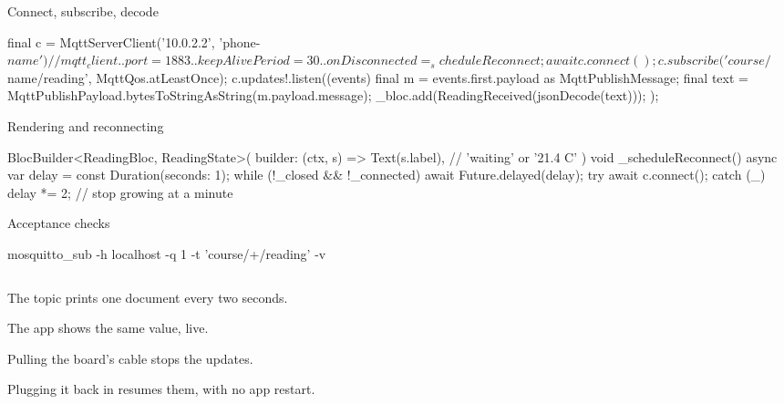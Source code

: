 \documentclass[10pt,aspectratio=169,t]{beamer}
\begin{document}
\begin{frame}[fragile,eyebrow=Task III]{Connect, subscribe, decode}
\begin{dart}
final c = MqttServerClient('10.0.2.2', 'phone-$name')  // mqtt_client
  ..port = 1883
  ..keepAlivePeriod = 30
  ..onDisconnected = _scheduleReconnect;
await c.connect();
c.subscribe('course/$name/reading', MqttQos.atLeastOnce);
c.updates!.listen((events) {
  final m = events.first.payload as MqttPublishMessage;
  final text = MqttPublishPayload.bytesToStringAsString(m.payload.message);
  _bloc.add(ReadingReceived(jsonDecode(text)));
});
\end{dart}
  \vskip 1mm
\end{frame}

\begin{frame}[fragile,eyebrow=Task III]{Rendering and reconnecting}
\begin{dart}
BlocBuilder<ReadingBloc, ReadingState>(
  builder: (ctx, s) => Text(s.label),   // 'waiting' or '21.4 C'
)
void _scheduleReconnect() async {
  var delay = const Duration(seconds: 1);
  while (!_closed && !_connected) {
    await Future.delayed(delay);
    try { await c.connect(); } catch (_) {}
    delay *= 2;              // stop growing at a minute
  }
}
\end{dart}
  \vskip 1mm
\end{frame}

\begin{frame}[fragile,eyebrow=Acceptance]{Acceptance checks}
  \vskip 1mm
\begin{shell}
mosquitto_sub -h localhost -q 1 -t 'course/+/reading' -v
\end{shell}
  \vskip 3mm
  \begin{columns}[T]
    \begin{column}{0.48\textwidth}
      \begin{checklist}
        \item The topic prints one document every two seconds.
        \item The app shows the same value, live.
        \item Pulling the board's cable stops the updates.
        \item Plugging it back in resumes them, with no app restart.
      \end{checklist}
    \end{column}
    \begin{column}{0.48\textwidth}
    \end{column}
  \end{columns}
\end{frame}
\end{document}
